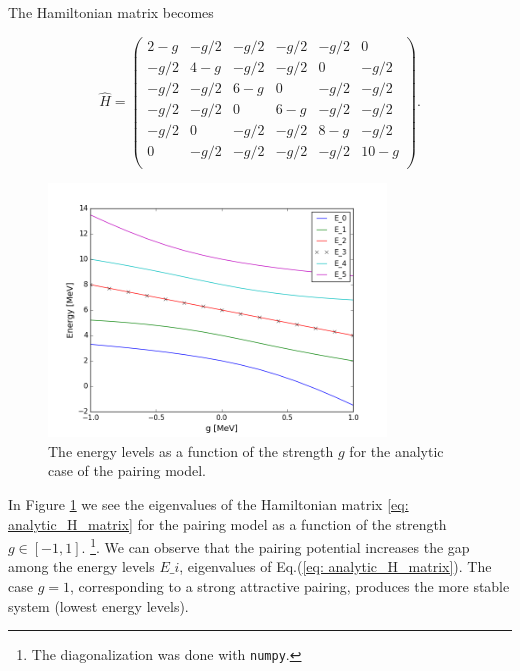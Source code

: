 \documentclass[twoside]{article}
\begin{document}
The Hamiltonian matrix becomes

\begin{equation}
\hat H = \begin{pmatrix}
2 - g & -g/2 & -g/2 & -g/2 & -g/2 & 0 \\
-g/2 & 4- g & -g/2 & -g/2 & 0 & -g/2 \\
-g/2 & -g/2 & 6 -g & 0 & -g/2 & -g/2 \\
-g/2 & -g/2 & 0 & 6 -g & -g/2 & -g/2 \\
-g/2 & 0 & -g/2 & -g/2 & 8 - g & -g/2 \\
0 & -g/2 & -g/2 & -g/2 & -g/2 & 10 - g \\
\end{pmatrix} .
\label{eq: analytic_H_matrix} 
\end{equation}

\begin{figure}[ht]
\centering
\includegraphics[width=0.8\textwidth]{eigval_vs_g.png}
\caption{The energy levels as a function of the strength $g$ for the analytic case of the pairing model. }
\label{fig: g_vs_eigval}
\end{figure}

In Figure \ref{fig: g_vs_eigval} we see the eigenvalues of the Hamiltonian matrix \eqref{eq: analytic_H_matrix} for the pairing model as a function of the strength $g \in [-1,1]$. \footnote{The diagonalization was done with \texttt{numpy}.}. We can observe that the pairing potential increases the gap among the energy levels $E\_i$, eigenvalues of Eq.(\ref{eq: analytic_H_matrix}). The case $g=1$, corresponding to a strong attractive pairing, produces the more stable system (lowest energy levels).

\end{document}
